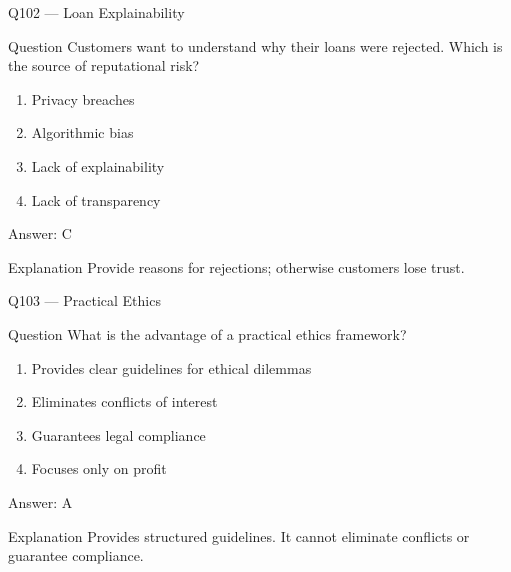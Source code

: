 \documentclass[aspectratio=169,8pt]{beamer}
\begin{document}
	\begin{frame}{Q102 --- Loan Explainability}
		\begin{block}{Question}
			Customers want to understand why their loans were rejected. Which is the source of reputational risk?
		\end{block}
		\begin{enumerate}
			\item Privacy breaches
			\item Algorithmic bias
			\item Lack of explainability
			\item Lack of transparency
		\end{enumerate}
		\begin{exampleblock}{Answer: C}\end{exampleblock}
		\begin{block}{Explanation}
			Provide reasons for rejections; otherwise customers lose trust.
		\end{block}
	\end{frame}
	
	\begin{frame}{Q103 --- Practical Ethics}
		\begin{block}{Question}
			What is the advantage of a practical ethics framework?
		\end{block}
		\begin{enumerate}
			\item Provides clear guidelines for ethical dilemmas
			\item Eliminates conflicts of interest
			\item Guarantees legal compliance
			\item Focuses only on profit
		\end{enumerate}
		\begin{exampleblock}{Answer: A}\end{exampleblock}
		\begin{block}{Explanation}
			Provides structured guidelines. It cannot eliminate conflicts or guarantee compliance.
		\end{block}
	\end{frame}
	
\end{document}

